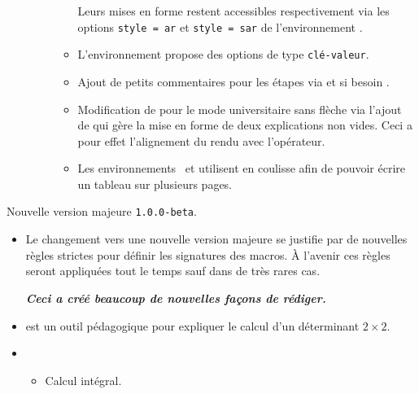 \documentclass[12pt,a4paper]{book}
\begin{document}
\begin{description}
\begin{itemize}[itemsep=.5em]
\begin{itemize}[itemsep=.5em]
              Leurs mises en forme restent accessibles respectivement via les options \verb+style = ar+ et \verb+style = sar+ de l'environnement .


        \item L'environnement  propose des options de type \texttt{clé-valeur}.


        \item Ajout de petits commentaires pour les étapes via  et si besoin .


        \item Modification de  pour le mode universitaire sans flèche via l'ajout de  qui gère la mise en forme de deux explications non vides.
              Ceci a pour effet l'alignement du rendu avec l'opérateur.


        \item Les environnements  et  utilisent  en coulisse afin de pouvoir écrire un tableau sur plusieurs pages.
    \end{itemize}
\end{itemize}

\end{description}\begin{description}
\medskip
\item[2020-06-21] Nouvelle version majeure \verb+1.0.0-beta+.

\begin{itemize}[itemsep=.5em]
    \item Le changement vers une nouvelle version majeure se justifie par de nouvelles règles strictes pour définir les signatures des macros. À l'avenir ces règles seront appliquées tout le temps sauf dans de très rares cas.
    \begin{center}
		\bfseries\itshape
		Ceci a créé beaucoup de nouvelles façons de rédiger.
    \end{center}





    \separation
    \item {}
           est un outil pédagogique pour expliquer le calcul d'un déterminant $2\times2$.




    \separation
    \item {}
    \begin{itemize}[itemsep=.5em]
        \item Calcul intégral.
        

\end{itemize}
\end{itemize}
\end{description}
\end{document}

